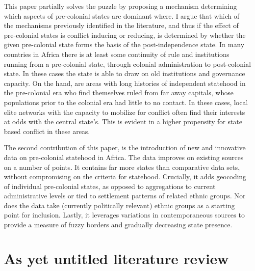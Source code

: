 \documentclass[12pt]{article}
\begin{document}
This paper partially solves the puzzle by proposing a mechanism determining
which aspects of pre-colonial states are dominant where. I argue that which of
the mechanisms previously identified in the literature, and thus if the effect
of pre-colonial states is conflict inducing or reducing, is determined by
whether the given pre-colonial state forms the basis of the post-independence
state. In many countries in Africa there is at least some continuity of rule and
institutions running from a pre-colonial state, through colonial administration
to post-colonial state. In these cases the state is able to draw on old
institutions and governance capacity. On the hand, are areas with long histories
of independent statehood in the pre-colonial era who find themselves ruled from
far away capitals, whose populations prior to the colonial era had little to no
contact. In these cases, local elite networks with the capacity to mobilize for
conflict often find their interests at odds with the central state's. This is
evident in a higher propensity for state based conflict in these areas.

The second contribution of this paper, is the introduction of new and innovative
data on pre-colonial statehood in Africa. The data improves on existing sources on
a number of points. It contains far more states than comparative data sets,
without compromising on the criteria for statehood. Crucially, it adds geocoding
of individual pre-colonial states, as opposed to aggregations to current
administrative levels or tied to settlement patterns of related ethnic groups.
Nor does the data take (currently politically relevant) ethnic groups as
a starting point for inclusion. %
Lastly, it leverages variations in contemporaneous sources to provide a measure
of fuzzy borders and gradually decreasing state presence.

\section{As yet untitled literature review}
\end{document}
